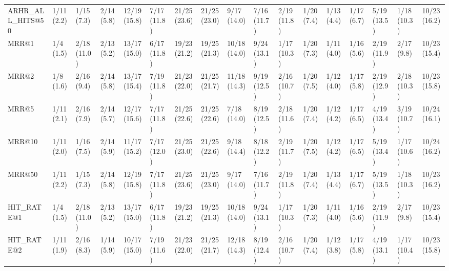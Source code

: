 \begin{tabular}{lllllllllllllllll}
ARHR_ALL_HITS@50            &     1/11 (2.2) &     1/15 (7.3) &    2/14 (5.8) &   12/19 (15.8) &    7/17 (11.8) &      21/25 (23.6) &   21/25 (23.0) &   9/17 (14.0) &    7/16 (11.7) &  2/19 (11.8) &  1/20 (7.4) &     1/13 (4.4) &            1/17 (6.7) &         5/19 (13.5) &  1/18 (10.3) &  10/23 (16.2) \\
MRR@1                       &      1/4 (1.5) &    2/18 (11.0) &    2/13 (5.2) &   13/17 (15.0) &    6/17 (11.8) &      19/23 (21.2) &   19/25 (21.3) &  10/18 (14.0) &    9/24 (13.1) &  1/17 (10.3) &  1/20 (7.3) &     1/11 (4.0) &            1/16 (5.6) &         2/19 (11.9) &   2/17 (9.8) &  10/23 (15.4) \\
MRR@2                       &      1/8 (1.6) &     2/16 (9.4) &    2/14 (5.8) &   13/17 (15.4) &    7/19 (11.8) &      21/23 (22.0) &   21/25 (21.7) &  11/18 (14.3) &    9/19 (12.5) &  2/16 (10.7) &  1/20 (7.5) &     1/12 (4.0) &            1/17 (5.8) &         2/19 (12.9) &  2/18 (10.3) &  10/23 (15.8) \\
MRR@5                       &     1/11 (2.1) &     2/16 (7.9) &    2/14 (5.7) &   12/17 (15.6) &    7/17 (11.8) &      21/25 (22.6) &   21/25 (22.6) &   7/18 (14.0) &    8/19 (12.5) &  2/18 (11.6) &  1/20 (7.4) &     1/12 (4.2) &            1/17 (6.5) &         4/19 (13.4) &  3/19 (10.7) &  10/24 (16.1) \\
MRR@10                      &     1/11 (2.0) &     1/16 (7.5) &    2/14 (5.9) &   11/17 (15.2) &    7/17 (12.0) &      21/25 (23.0) &   21/25 (22.6) &   9/18 (14.4) &    8/18 (12.2) &  2/19 (11.7) &  1/20 (7.5) &     1/12 (4.2) &            1/17 (6.5) &         5/19 (13.4) &  1/17 (10.6) &  10/24 (16.2) \\
MRR@50                      &     1/11 (2.2) &     1/15 (7.3) &    2/14 (5.8) &   12/19 (15.8) &    7/17 (11.8) &      21/25 (23.6) &   21/25 (23.0) &   9/17 (14.0) &    7/16 (11.7) &  2/19 (11.8) &  1/20 (7.4) &     1/13 (4.4) &            1/17 (6.7) &         5/19 (13.5) &  1/18 (10.3) &  10/23 (16.2) \\
HIT_RATE@1                  &      1/4 (1.5) &    2/18 (11.0) &    2/13 (5.2) &   13/17 (15.0) &    6/17 (11.8) &      19/23 (21.2) &   19/25 (21.3) &  10/18 (14.0) &    9/24 (13.1) &  1/17 (10.3) &  1/20 (7.3) &     1/11 (4.0) &            1/16 (5.6) &         2/19 (11.9) &   2/17 (9.8) &  10/23 (15.4) \\
HIT_RATE@2                  &     1/11 (1.9) &     2/16 (8.3) &    1/14 (5.9) &   10/17 (15.0) &    7/19 (11.6) &      21/23 (22.0) &   21/25 (21.7) &  12/18 (14.3) &    8/19 (12.4) &  2/16 (10.7) &  1/20 (7.4) &     1/12 (3.8) &            1/17 (5.8) &         4/19 (13.1) &  1/17 (10.4) &  10/23 (15.8) \\

\end{tabular}
